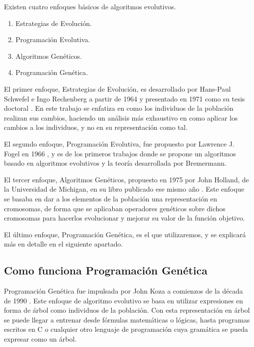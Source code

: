 Existen cuatro enfoques básicos de algoritmos evolutivos.

\begin{enumerate}
	\item Estrategias de Evolución.
	\item Programación Evolutiva.
	\item Algoritmos Genéticos.
	\item Programación Genética.
\end{enumerate}

El primer enfoque, Estrategias de Evolución, es desarrollado por Hans-Paul Schwefel e Ingo Rechenberg a partir de 1964 y presentado en 1971 como su tesis doctoral \cite{estrategiasEvolucion}. En este trabajo se enfatiza en como los individuos de la población realizan sus cambios, haciendo un análisis más exhaustivo en como aplicar los cambios a los individuos, y no en su representación como tal.

El segundo enfoque, Programación Evolutiva, fue propuesto por Lawrence J. Fogel en 1966 \cite{programacionEvolutiva}, y es de los primeros trabajos donde se propone un algoritmos basado en algoritmos evolutivos y la teoría desarrollada por Bremermann.

El tercer enfoque, Algoritmos Genéticos, propuesto en 1975 por John Holland, de la Universidad de Michigan, en su libro publicado ese mismo año \cite{libroAlgoritmosGeneticos}. Este enfoque se basaba en dar a los elementos de la población una representación en cromosomas, de forma que se aplicaban operadores genéticos sobre dichos cromosomas para hacerlos evolucionar y mejorar su valor de la función objetivo.

El último enfoque, Programación Genética, es el que utilizaremos, y se explicará más en detalle en el siguiente apartado.


\subsection{Como funciona Programación Genética}

Programación Genética fue impulsada por John Koza a comienzos de la década de 1990 \cite{kozaGP}. Este enfoque de algoritmo evolutivo se basa en utilizar expresiones en forma de árbol como individuos de la población. Con esta representación en árbol se puede llegar a entrenar desde fórmulas matemáticas o lógicas, hasta programas escritos en C o cualquier otro lenguaje de programación cuya gramática se pueda expresar como un árbol.

